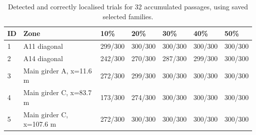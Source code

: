 \begin{table}[htbp]
\centering
\small
\setlength{\tabcolsep}{4pt}
\caption{Detected and correctly localised trials for 32 accumulated passages, using saved selected families.}
\label{tab:kw51-accepted-32}
\begin{tabular}{@{}lllllll@{}}
\toprule
ID & Zone & 10\% & 20\% & 30\% & 40\% & 50\% \\
\midrule
1 & A11 diagonal & 299/300 & 300/300 & 300/300 & 300/300 & 300/300 \\
2 & A14 diagonal & 242/300 & 270/300 & 287/300 & 299/300 & 300/300 \\
3 & Main girder A, x=11.6 m & 272/300 & 299/300 & 300/300 & 300/300 & 300/300 \\
4 & Main girder C, x=83.7 m & 173/300 & 274/300 & 300/300 & 300/300 & 300/300 \\
5 & Main girder C, x=107.6 m & 272/300 & 300/300 & 300/300 & 300/300 & 300/300 \\
\bottomrule
\end{tabular}
\end{table}

